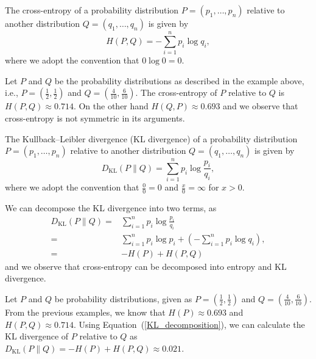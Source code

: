 \begin{defn}
	The cross-entropy of a probability distribution $P = (p_1,\ldots,p_n)$ relative to another distribution $Q = (q_1,\ldots,q_n)$ is given by
	\begin{equation*}
		H(P,Q) = -\sum_{i=1}^{n} p_i \log q_i,
	\end{equation*}
	where we adopt the convention that $0 \log 0 = 0$.
	\label{Cross-Entropy}
\end{defn}

\begin{example}
	Let $P$ and $Q$ be the probability distributions as described in the example above, i.e., $P = (\frac{1}{2},\frac{1}{2})$ and $Q = (\frac{4}{10},\frac{6}{10})$. The cross-entropy of $P$ relative to $Q$ is $H(P,Q) \approx 0.714$. On the other hand $H(Q,P) \approx 0.693$  and we observe that cross-entropy is not symmetric in its arguments.
\end{example}

\begin{defn}
	The Kullback–Leibler divergence (KL divergence) of a probability distribution $P = (p_1,\ldots,p_n)$ relative to another distribution $Q = (q_1,\ldots,q_n)$ is given by
	\begin{equation*}
		D_{\text{KL}}(P \| Q) = \sum_{i=1}^{n} p_i \log \frac{p_i}{q_i},
	\end{equation*}
	where we adopt the convention that $\frac{0}{0} = 0$ and $\frac{x}{0} = \infty$ for $x>0$.
	\label{KL Divergence}
\end{defn} 

We can decompose the KL divergence into two terms, as
\begin{equation}
	\begin{aligned}
		D_{\text{KL}}(P \| Q) =& \sum_{i=1}^{n} p_i \log \frac{p_i}{q_i} \\
		=& \sum_{i=1}^{n} p_i \log p_i  + \left( - \sum_{i=1}^{n} p_i \log q_i \right), \\
		=& - H(P) + H(P, Q)
	\end{aligned}
	\label{KL_decomposition}
\end{equation}
and we observe that cross-entropy can be decomposed into entropy and KL divergence.

\begin{example}
	Let $P$ and $Q$ be probability distributions, given as $P = (\frac{1}{2},\frac{1}{2})$ and $Q = (\frac{4}{10},\frac{6}{10})$. From the previous examples, we know that $H(P) \approx 0.693$ and $H(P,Q) \approx 0.714$. Using Equation~(\ref{KL_decomposition}), we can calculate the KL divergence of $P$ relative to $Q$ as $D_{\text{KL}}(P \| Q) = - H(P) + H(P, Q) \approx 0.021$.
\end{example}

